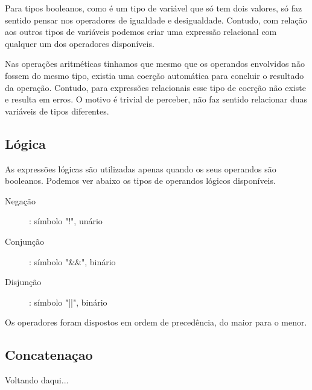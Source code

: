 \documentclass[
  12pt,				%
  oneside,			%
  a4paper,			%
  english,			%
  french,				%
  spanish,			%
  brazil,				%
]{abntex2}
\begin{document}
Para tipos booleanos, como é um tipo de variável que só tem dois
valores, só faz sentido pensar nos operadores de igualdade e
desigualdade. Contudo, com relação aos outros tipos de variáveis
podemos criar uma expressão relacional com qualquer um dos operadores
disponíveis.

Nas operações aritméticas tinhamos que mesmo que os
operandos envolvidos não fossem do mesmo tipo, existia uma coerção
automática para concluir o resultado da operação. Contudo, para
expressões relacionais esse tipo de coerção não existe e resulta em
erros. O motivo é trivial de perceber, não faz sentido relacionar duas
variáveis de tipos diferentes.

\subsection{Lógica}
\label{subsec:logicas}

As expressões lógicas são utilizadas apenas quando os seus operandos
são booleanos. Podemos ver abaixo os tipos de operandos lógicos
disponíveis.

\begin{description}
\item [Negação]: símbolo "!", unário
\item [Conjunção]: símbolo "\&\&", binário
\item [Disjunção]: símbolo "||", binário
\end{description}

Os operadores foram dispostos em ordem de precedência, do maior para o
menor.

\subsection{Concatenaçao}
\label{subsec:concatenacao}

Voltando daqui...










\postextual


\printindex
\end{document}
